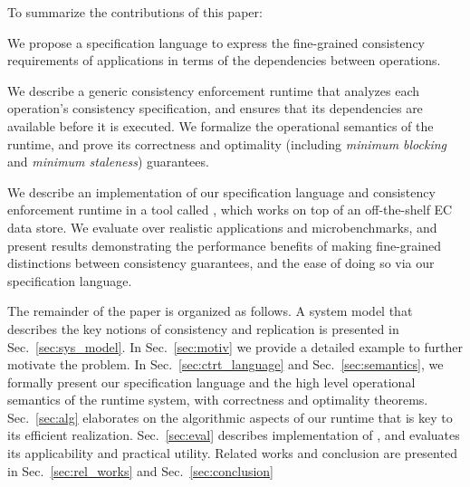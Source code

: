 To summarize the contributions of this paper:
\begin{enumerate*}[label=(\roman*)]  
\item We propose a specification language to
    express the fine-grained consistency requirements of applications 
    in terms of the dependencies between operations.

\item We describe a generic consistency enforcement runtime that
    analyzes each operation's consistency specification, and ensures
    that its dependencies are available before it is executed.    
    We formalize the operational semantics of the runtime, and prove its
    correctness and optimality (including \emph{minimum blocking} and
    \emph {minimum staleness}) guarantees. 
    
  \item We describe an implementation of our specification language and
    consistency enforcement runtime in a tool called \tool, which
    works on top of an off-the-shelf EC data store. We evaluate \tool
    over realistic applications and microbenchmarks, and present
    results demonstrating the performance benefits of making
    fine-grained distinctions between consistency guarantees, and the
    ease of doing so via our specification language.

\end{enumerate*}

The remainder of the paper is organized as follows. A system model that
describes the key notions of consistency and
replication is presented in Sec.~\ref{sec:sys_model}.  In
Sec.~\ref{sec:motiv} we provide a detailed example to further motivate
the problem.  In Sec.~\ref{sec:ctrt_language} and
Sec.~\ref{sec:semantics}, we formally present our specification language
and the high level operational semantics of the runtime system, with
correctness and optimality theorems. Sec.~\ref{sec:alg}
elaborates on the algorithmic aspects of our runtime that is key to
its efficient realization. Sec.~\ref{sec:eval} describes
implementation of \tool, and evaluates its applicability and practical utility.
Related works and conclusion are presented in
Sec.~\ref{sec:rel_works} and Sec.~\ref{sec:conclusion}








